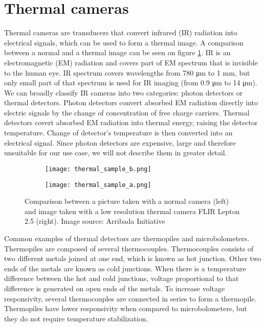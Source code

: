 \section{ Thermal cameras}

Thermal cameras are transducers that convert infrared (IR) radiation into electrical signals, which can be used to form a thermal image.
A comparison between a normal and a thermal image can be seen on figure \ref{thermal_comparison}.
IR is an electromagnetic (EM) radiation and covers part of EM spectrum that is invisible to the human eye.
IR spectrum covers wavelengths from 780 \si{\micro\meter} to 1 \si{\milli\meter}, but only small part of that spectrum is used for IR imaging (from 0.9 \si{\micro\meter} to 14 \si{\micro\meter})\cite{thermal_book}.
We can broadly classify IR cameras into two categories: photon detectors or thermal detectors\cite{thermal_book}.
Photon detectors convert absorbed EM radiation directly into electric signals by the change of concentration of free charge carriers\cite{thermal_book}.
Thermal detectors covert absorbed EM radiation into thermal energy, raising the detector temperature\cite{thermal_book}. 
Change of detector's temperature is then converted into an electrical signal.
Since photon detectors are expensive, large and therefore unsuitable for our use case, we will not describe them in greater detail.

\begin{figure}[ht]
    \begin{subfigure}{0.5\textwidth}
        \centering
        \texttt{[image: thermal\_sample\_b.png]} 
    \end{subfigure}
    \begin{subfigure}{0.5\textwidth}
        \centering
        \texttt{[image: thermal\_sample\_a.png]}
    \end{subfigure}
    \caption{Comparison between a picture taken with a normal camera (left) and image taken with a low resolution thermal camera FLIR Lepton 2.5 (right). Image source: Arribada Initiative\cite{thermal_comparison}}
    \label{thermal_comparison}
\end{figure}

Common examples of thermal detectors are thermopiles and microbolometers. 
Thermopiles are composed of several thermocouples.
Thermocouples consists of two different metals joined at one end, which is known as hot junction.
Other two ends of the metals are known as cold junctions.
When there is a temperature difference between the hot and cold junctions, voltage proportional to that difference is generated on open ends of the metals.
To increase voltage responsivity, several thermocouples are connected in series to form a thermopile\cite{thermal_book}.
Thermopiles have lower responsivity when compared to microbolometers, but they do not require temperature stabilization\cite{thermal_book}.

